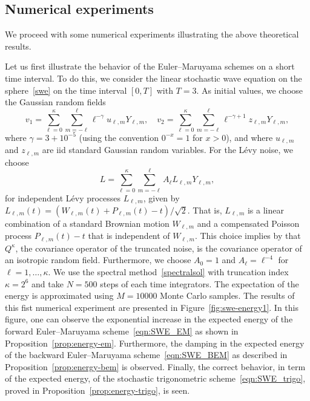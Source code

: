 \documentclass[11pt]{amsart}
\begin{document}
\subsection{Numerical experiments}
We proceed with some numerical experiments illustrating the above theoretical results.

Let us first illustrate the behavior of the Euler--Maruyama schemes on a short time interval. To do this,
we consider the linear stochastic wave equation on the sphere~\eqref{swe} on the time interval $[0,T]$ with $T=3$.
As initial values, we choose the Gaussian random fields
$$
v_1 = \sum_{\ell=0}^{\kappa} \sum_{m=-\ell}^{\ell} \ell^{-\gamma} u_{\ell , m} Y_{\ell , m}, \quad v_2 = \sum_{\ell=0}^{\kappa} \sum_{m=-\ell}^{\ell} \ell^{-\gamma+1} z_{\ell , m} Y_{\ell , m},
$$
where $\gamma=3+10^{-5}$ (using the convention $0^{-x}=1$ for $x>0$), and where $u_{\ell , m}$ and $z_{\ell , m}$ are iid standard Gaussian random variables. For the L\' evy noise, we choose
$$
L = \sum_{\ell=0}^{\kappa} \sum_{m=-\ell}^{\ell} A_\ell L_{\ell, m} Y_{\ell , m},
$$
for independent Lévy processes $L_{\ell,m}$, given by $L_{\ell, m}(t) = \left(W_{\ell, m}(t) + P_{\ell, m}(t) - t\right) / \sqrt{2}$.
That is, $L_{\ell, m}$ is a linear combination of a standard Brownian motion $W_{\ell, m}$ and a compensated Poisson process $P_{\ell, m}(t) - t$ that is independent of $W_{\ell, m}$.
This choice implies by \cite{marinucciRandomFieldsSphere2011a} that $Q^\kappa$, the covariance operator of the truncated noise, is the covariance operator of an isotropic random field.
Furthermore, we choose $A_0 = 1$ and $A_\ell = \ell^{-4}$ for $\ell = 1, \dots, \kappa$.
We use the spectral method~\eqref{spectralsol}
with truncation index $\kappa=2^6$ and take $N=500$ steps of each time integrators. The expectation of the energy is approximated using $M=10000$ Monte Carlo samples.
The results of this fist numerical experiment are presented in Figure~\ref{fig:swe-energy1}.
In this figure, one can observe the exponential increase in the expected energy of the forward Euler--Maruyama scheme~\eqref{eqn:SWE_EM}
as shown in Proposition~\ref{prop:energy-em}. Furthermore, the damping in the expected energy of the backward Euler--Maruyama
scheme~\eqref{eqn:SWE_BEM} as described in Proposition~\ref{prop:energy-bem} is observed. Finally, the correct behavior, in term
of the expected energy, of the stochastic trigonometric scheme~\eqref{eqn:SWE_trigo}, proved in Proposition~\ref{prop:energy-trigo}, is seen.
\end{document}
